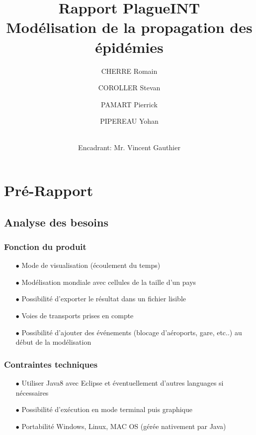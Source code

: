 \documentclass[12pt,a4paper]{report}
\title{ \Huge \textbf{Rapport PlagueINT} \\ \large Modélisation de la propagation des épidémies}
\author{
CHERRE Romain
\and COROLLER Stevan 
\and PAMART Pierrick
\and PIPEREAU Yohan
\and \\
Encadrant: Mr. Vincent Gauthier }
\begin{document}
\maketitle

\tableofcontents

\newpage

\chapter*{Pré-Rapport}

\section*{Analyse des besoins}

\subsection*{Fonction du produit}
\begin{flushleft}
  \begin{itemize}
	\item[$\bullet$] Mode de visualisation (écoulement du temps) 
	\item[$\bullet$] Modélisation mondiale avec cellules de la taille d'un pays
	\item[$\bullet$] Possibilité d'exporter le résultat dans un fichier lisible 
	\item[$\bullet$] Voies de transports prises en compte 
	\item[$\bullet$] Possibilité d'ajouter des événements (blocage d'aéroports, gare, etc..) au début de la modélisation
  \end{itemize}
\end{flushleft}

\subsection*{Contraintes techniques}
\begin{flushleft}
  \begin{itemize}
	\item[$\bullet$] Utiliser Java8 avec Eclipse et éventuellement d'autres languages si nécessaires 
	\item[$\bullet$] Possibilité d'exécution en mode terminal puis graphique
	\item[$\bullet$] Portabilité Windows, Linux, MAC OS (gérée nativement par Java)
    \end{itemize}
\end{flushleft}
\end{document}
